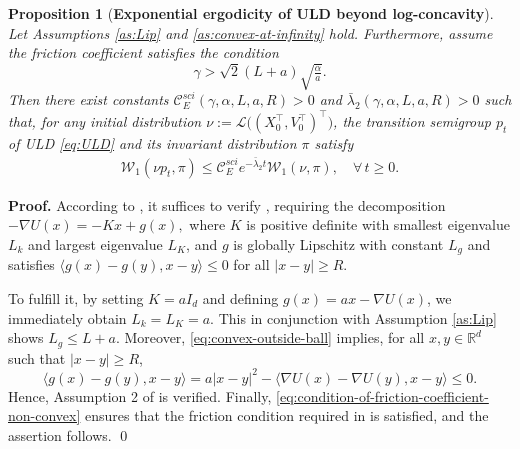 \documentclass[12pt]{article}
\newenvironment{bluetext}
  {\color{black}\ignorespaces}
  {\ignorespacesafterend}
\numberwithin{equation}{section}
\renewenvironment{proof}%
  {\begin{trivlist}%
   \item[]\ignorespaces}%
  {\qed\end{trivlist}}
\newcommand{\R}{\mathbb{R}}
\newtheorem{prop}{Proposition}[section]
\begin{document}
\begin{bluetext}

\begin{prop}[\textbf{Exponential ergodicity of ULD beyond log-concavity}]\label{prop:erg-non-convex}
    Let Assumptions \ref{as:Lip} and \ref{as:convex-at-infinity} hold. Furthermore, assume the friction coefficient satisfies the condition 
    \begin{equation}
    \label{eq:condition-of-friction-coefficient-non-convex}
    \gamma>
    \sqrt{2}(L+a)\sqrt{\tfrac{\alpha}{a}}.
    \end{equation}
    Then there exist constants
    \(
    \mathcal C_E^{sci}(\gamma,\alpha,L,a, R)>0\)
    and 
    \(\bar{\lambda}_2(\gamma,\alpha,L,a, R)>0
    \)
    such that, for any initial distribution $\nu := \mathcal{L}\big((X_0^\top, V_0^\top)^\top\big)$, the transition semigroup \(p_t\) of ULD \eqref{eq:ULD} and its invariant distribution \(\pi\) satisfy
    \begin{align*}
        \mathcal{W}_{1}(\nu p_t,\pi)\leq \mathcal C_E^{sci} e^{-\bar{\lambda}_2t}\mathcal{W}_{1}(\nu,\pi),\quad \forall \, t \geq 0.
    \end{align*}
\end{prop}

\begin{proof}
\textbf{Proof.}
According to \cite[Theorem 5]{schuh2024global}, it suffices to verify
\cite[Assumption 2]{schuh2024global}, requiring the decomposition
\(-\nabla U(x) = -K x + g(x),\)
where $K$ is positive definite with smallest eigenvalue $L_k$ and largest eigenvalue \(L_K\), and $g$ is globally Lipschitz with constant \(L_g\) and satisfies
\(\langle g(x) - g(y), x - y \rangle \leq 0\)
for all \(|x - y| \geq R\).

To fulfill  it, by setting \(K = a I_d\) and defining \(g(x) = a x - \nabla U(x)\), we immediately obtain \(L_k = L_K = a\). This in conjunction with Assumption \ref{as:Lip} shows \(L_g \leq L + a\). Moreover, \eqref{eq:convex-outside-ball} implies, for all $x,y \in \R^d$ such that $|x-y|\ge R$,
\[
\langle g(x) - g(y), x - y \rangle
= a |x - y|^2 - \langle \nabla U(x) - \nabla U(y), x - y \rangle
\leq 0.
\]
Hence, Assumption 2 of \cite{schuh2024global} is verified. Finally, \eqref{eq:condition-of-friction-coefficient-non-convex} ensures that the friction condition required in \cite[Theorem 5]{schuh2024global} is satisfied, and the assertion follows.
\end{proof}
\end{bluetext}
\end{document}
